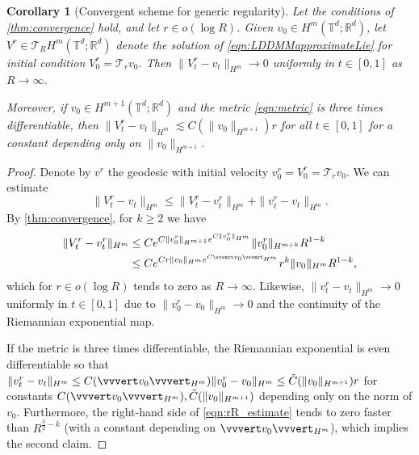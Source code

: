 \documentclass[a4paper, 12pt]{article}
\newtheorem{corollary}[theorem]{Corollary}
\newcommand{\R}{\mathbb{R}}
\newcommand{\T}{\mathbb{T}}
\newcommand{\trunc}[1][R]{\mathcal{T}_{#1}}
\newcommand{\NHm}[1]{\vvvert#1\vvvert_{H^m}} %
\begin{document}
\begin{corollary}[Convergent scheme for generic regularity]\label{thm:convergenceGenericRegularity}
Let the conditions of \cref{thm:convergence} hold, and let $r\in o(\log R)$.
Given $v_0\in H^m(\T^d;\R^d)$, let $V^r\in\trunc H^{m}(\T^d;\R^d)$ denote the solution of \eqref{eqn:LDDMMapproximateLie} for initial condition $V^r_0=\trunc[r]v_0$.
Then $\|V^r_t-v_t\|_{H^m}\to0$ uniformly in $t\in[0,1]$ as $R\to\infty$.

Moreover, if $v_0\in H^{m+1}(\T^d;\R^d)$ and the metric \eqref{eqn:metric} is three times differentiable,
then $\|V^r_t-v_t\|_{H^m}\lesssim C(\|v_0\|_{H^{m+1}})r$ for all $t\in[0,1]$ for a constant depending only on $\|v_0\|_{H^{m+1}}$.
\end{corollary}
\begin{proof}
Denote by $v^r$ the geodesic with initial velocity $v^r_0=V^r_0=\trunc[r]v_0$.
We can estimate
\begin{equation*}
\|V^r_t-v_t\|_{H^m}
\leq\|V^r_t-v^r_t\|_{H^m}+\|v^r_t-v_t\|_{H^m}.
\end{equation*}
By \cref{thm:convergence}, for $k\geq2$ we have
\begin{align}
\|V^r_t-v^r_t\|_{H^m}
&\leq Ce^{C\|v_0^r\|_{H^{m+1}}e^{C\|v_0^r\|_{H^m}}}\|v_0^r\|_{H^{m+k}}R^{1-k}\nonumber\\
&\leq Ce^{Cr\|v_0\|_{H^{m}}e^{C\NHm{v_0}}}r^k\|v_0\|_{H^{m}}R^{1-k},\label{eqn:rR_estimate}
\end{align}
which for $r\in o(\log R)$ tends to zero as $R\to\infty$.
Likewise, $\|v^r_t-v_t\|_{H^m}\to0$ uniformly in $t\in[0,1]$ due to $\|v^r_0-v_0\|_{H^m}\to0$ and the continuity of the Riemannian exponential map.

If the metric is three times differentiable, the Riemannian exponential is even differentiable so that $\|v^r_t-v_t\|_{H^m}\leq C(\NHm{v_0})\|v^r_0-v_0\|_{H^m}\leq\tilde C(\|v_0\|_{H^{m+1}})r$
for constants $C(\NHm{v_0}),\tilde C(\|v_0\|_{H^{m+1}})$ depending only on the norm of $v_0$.
Furthermore, the right-hand side of \eqref{eqn:rR_estimate} tends to zero faster than $R^{\frac32-k}$ (with a constant depending on $\NHm{v_0}$),
which implies the second claim.
\end{proof}
\end{document}
